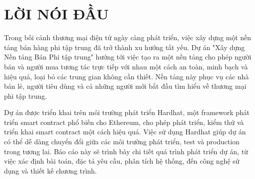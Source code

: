 \chapter*{LỜI NÓI ĐẦU}
Trong bối cảnh thương mại điện tử ngày càng phát triển, việc xây dựng một nền tảng bán hàng phi tập trung đã trở thành xu hướng tất yếu. Dự án "Xây dựng Nền tảng Bán Phi tập trung" hướng tới việc tạo ra một nền tảng cho phép người bán và người mua tương tác trực tiếp với nhau một cách an toàn, minh bạch và hiệu quả, loại bỏ các trung gian không cần thiết. Nền tảng này phục vụ các nhà bán lẻ, người tiêu dùng và cả những người mới bắt đầu tìm hiểu về thương mại phi tập trung.

Dự án được triển khai trên môi trường phát triển Hardhat, một framework phát triển smart contract phổ biến cho Ethereum, cho phép phát triển, kiểm thử và triển khai smart contract một cách hiệu quả. Việc sử dụng Hardhat giúp dự án có thể dễ dàng chuyển đổi giữa các môi trường phát triển, test và production trong tương lai. Báo cáo này sẽ trình bày chi tiết quá trình phát triển dự án, từ việc xác định bài toán, đặc tả yêu cầu, phân tích hệ thống, đến công nghệ sử dụng và thiết kế chương trình. 